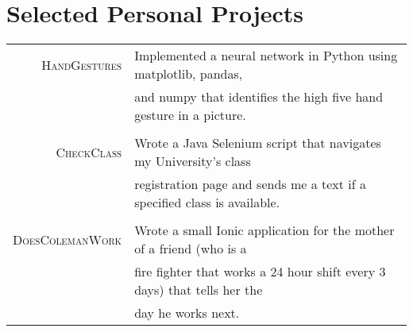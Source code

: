 \documentclass[a4paper,10pt]{article}
\begin{document}
\section{Selected Personal Projects}
\begin{tabular}{rl}
 \textsc{HandGestures} & Implemented a neural network in Python using matplotlib, pandas, \\
 
 & 
 
and numpy that identifies the high five hand gesture in a picture. \\

& \\
\textsc{CheckClass} & Wrote a Java Selenium script that navigates my University’s class \\
& registration page and sends me a text if a specified class is available. \\

& \\
\textsc{DoesColemanWork} & Wrote a small Ionic application for the mother of a friend (who is a \\
& fire fighter that works a 24 hour shift every 3 days) that tells her the \\

& day he works next. \\
\end{tabular}
\end{document}
